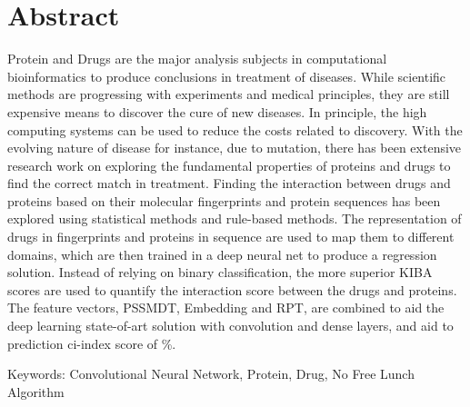 

\chapter*{Abstract}
\doublespacing
Protein and Drugs are the major analysis subjects in computational bioinformatics to produce conclusions in treatment of diseases. While scientific methods are progressing with experiments and medical principles, they are still expensive means to discover the cure of new diseases. In principle, the high computing systems can be used to reduce the costs related to discovery. With the evolving nature of disease for instance, due to mutation, there has been extensive research work on exploring the fundamental properties of proteins and drugs to find the correct match in treatment. Finding the interaction between drugs and proteins based on their molecular fingerprints and protein sequences has been explored using statistical methods and rule-based methods. The representation of drugs in fingerprints and proteins in sequence are used to map them to different domains, which are then trained in a deep neural net to produce a regression solution. Instead of relying on binary classification, the more superior KIBA scores are used to quantify the interaction score between the drugs and proteins. The feature vectors, PSSMDT, Embedding and RPT, are combined to aid the deep learning state-of-art solution with convolution and dense layers, and aid to prediction ci-index score of \%.

Keywords: Convolutional Neural Network, Protein, Drug, No Free Lunch Algorithm